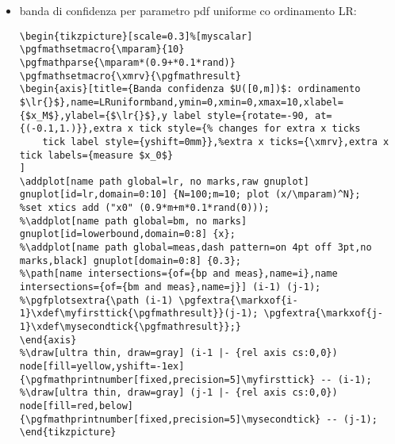 \begin{itemize}
\begin{verbatim}
\begin{frame}{Costruzione Neyman per pdf uniforme}
\begin{tikzpicture}[scale=1.5]
\begin{axis}[
%view       = {-5}{-5},
axis lines = middle,
xlabel=$x_M$, ylabel=$m$, zlabel=$\prob{(x_M;m)}$
]
\addplot3 [surf,
opacity=0.1
] gnuplot[id=xMband,raw gnuplot,surf] {N=20; f(x,y)=(x>y) ? 1/0:(N/y)*(x/y)^(N-1); splot [1:10][1:10] ((N/y)*(x/y)^(N-1))};
\end{axis}
\end{tikzpicture}
\end{frame}
\end{verbatim}
\item banda di confidenza per parametro pdf uniforme co ordinamento LR:
\begin{verbatim}
\begin{tikzpicture}[scale=0.3]%[myscalar]
\pgfmathsetmacro{\mparam}{10}
\pgfmathparse{\mparam*(0.9+*0.1*rand)}
\pgfmathsetmacro{\xmrv}{\pgfmathresult}
\begin{axis}[title={Banda confidenza $U([0,m])$: ordinamento $\lr{}$},name=LRuniformband,ymin=0,xmin=0,xmax=10,xlabel={$x_M$},ylabel={$\lr{}$},y label style={rotate=-90, at={(-0.1,1.)}},extra x tick style={% changes for extra x ticks
	tick label style={yshift=0mm}},%extra x ticks={\xmrv},extra x tick labels={measure $x_0$}
]
\addplot[name path global=lr, no marks,raw gnuplot] gnuplot[id=lr,domain=0:10] {N=100;m=10; plot (x/\mparam)^N};
%set xtics add ("x0" (0.9*m+m*0.1*rand(0)));
%\addplot[name path global=bm, no marks] gnuplot[id=lowerbound,domain=0:8] {x};
%\addplot[name path global=meas,dash pattern=on 4pt off 3pt,no marks,black] gnuplot[domain=0:8] {0.3};
%\path[name intersections={of={bp and meas},name=i},name intersections={of={bm and meas},name=j}] (i-1) (j-1);
%\pgfplotsextra{\path (i-1) \pgfextra{\markxof{i-1}\xdef\myfirsttick{\pgfmathresult}}(j-1); \pgfextra{\markxof{j-1}\xdef\mysecondtick{\pgfmathresult}};}
\end{axis}
%\draw[ultra thin, draw=gray] (i-1 |- {rel axis cs:0,0}) node[fill=yellow,yshift=-1ex]{\pgfmathprintnumber[fixed,precision=5]\myfirsttick} -- (i-1);
%\draw[ultra thin, draw=gray] (j-1 |- {rel axis cs:0,0}) node[fill=red,below]{\pgfmathprintnumber[fixed,precision=5]\mysecondtick} -- (j-1);
\end{tikzpicture}
\end{verbatim}
\end{itemize}

